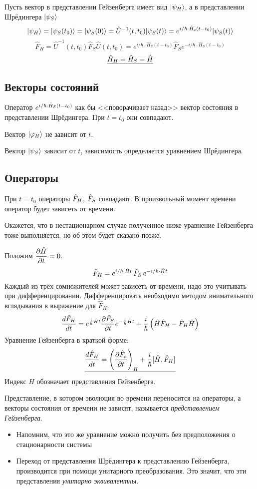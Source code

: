 Пусть вектор в представлении Гейзенберга имеет вид $| \psi_H \rangle$, а в представлении Шрёдингера $| \psi_S \rangle$
$$
    | \psi_H \rangle = | \psi_S(t_0) \rangle = | \psi_S(0) \rangle = \hat U^{-1} (t, t_0) | \psi_S (t) \rangle
    = e^{i/\hbar \cdot \Hat H_s (t-t_0)} | \psi_S(t) \rangle
$$
$$
    \hat F_H = \hat U^{-1} (t, t_0) \hat F_S \hat U(t,t_0) = e^{i/\hbar \cdot \hat H_S (t-t_0)}
    \hat F_S e^{-i/\hbar \cdot \hat H_S (t-t_0)}
$$
$$
    \underline{\Hat H_H = \Hat H_S = \hat H}
$$
\subsection{Векторы состояний}
Оператор $e^{i/\hbar \cdot \Hat H_S (t-t_0)}$ как бы <<поворачивает назад>> вектор состояния в представлении Шрёдингера. При $t = t_0$ они совпадают.

Вектор $| \varphi_H \rangle$ не зависит от $t$.

Вектор $| \psi_S \rangle$ зависит от $t$, зависимость определяется уравнением Шрёдингера.

\subsection{Операторы}
При $t = t_0$ операторы $\Hat F_H$, $\Hat F_S$ совпадают. В произвольный момент времени оператор будет зависеть от времени.

\Rem Окажется, что в нестационарном случае полученное ниже уравнение Гейзенберга тоже выполняется, но об этом будет сказано позже.

Положим $\dfrac{\partial \hat H}{\partial t} = 0$.
$$
    \Hat F_H = e^{i/\hbar \cdot \Hat H t} \, \Hat F_S \, e^{-i/\hbar \cdot \Hat H t}
$$
Каждый из трёх сомножителей может зависеть от времени, надо это учитывать при дифференцировании. Дифференцировать необходимо методом внимательного вглядывания в выражение для $\hat F_H$.
$$
    \dfrac{d \Hat F_H}{dt} = e^{\frac{i}{\hbar} \Hat H t} \dfrac{\partial \Hat F_S}{\partial t} e^{-\frac{i}{\hbar}\Hat H t}
    + \dfrac{i}{\hbar} \left(
        { \Hat H \Hat F_H - \Hat F_H \Hat H }
    \right)
$$
Уравнение Гейзенберга в краткой форме:
$$
    \underline{\dfrac{d\Hat F_H}{dt} = \left(\dfrac{\partial \Hat F_s}{\partial t}\right)_H + \dfrac{i}{\hbar} [\Hat H, \Hat F_H]}
$$
Индекс $H$ обозначает представления Гейзенберга.

\Def Представление, в котором эволюция во времени переносится на операторы, а векторы состояния от времени не зависят, называется \emph{представлением Гейзенберга}.

\Rem
\begin{itemize}
  \item Напомним, что это же уравнение можно получить без предположения о стационарности системы
  \item Переход от представления Шрёдингера к представлению Гейзенберга, производится при помощи унитарного преобразования. Это значит, что эти представления \emph{унитарно эквивалентны}.
\end{itemize}

